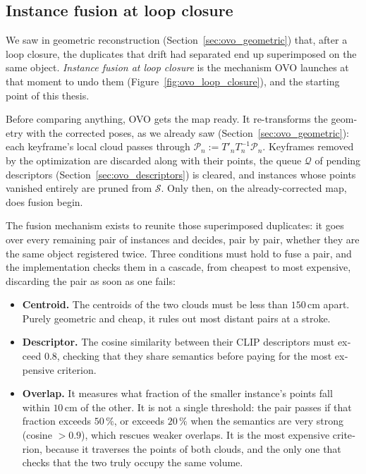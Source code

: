 \begin{otherlanguage}{english}
\subsection{Instance fusion at loop closure}
\label{sec:ovo_fusion_lc}

We saw in geometric reconstruction (Section~\ref{sec:ovo_geometric}) that, after a loop closure, the
duplicates that drift had separated end up superimposed on the same object. \emph{Instance fusion at
loop closure} is the mechanism OVO launches at that moment to undo them
(Figure~\ref{fig:ovo_loop_closure}), and the starting point of this thesis.

Before comparing anything, OVO gets the map ready. It re-transforms the geometry with the corrected
poses, as we already saw (Section~\ref{sec:ovo_geometric}): each keyframe's local cloud passes
through $\mathcal{P}_n := T'_n T_n^{-1} \mathcal{P}_n$. Keyframes removed by the optimization are
discarded along with their points, the queue $\mathcal{Q}$ of pending descriptors
(Section~\ref{sec:ovo_descriptors}) is cleared, and instances whose points vanished entirely are
pruned from $\mathcal{S}$. Only then, on the already-corrected map, does fusion begin.

The fusion mechanism exists to reunite those superimposed duplicates: it goes over every remaining
pair of instances and decides, pair by pair, whether they are the same object registered twice. Three
conditions must hold to fuse a pair, and the implementation checks them in a cascade, from cheapest
to most expensive, discarding the pair as soon as one fails:

\begin{itemize}
  \item \textbf{Centroid.} The centroids of the two clouds must be less than $150\,\text{cm}$ apart.
    Purely geometric and cheap, it rules out most distant pairs at a stroke.
  \item \textbf{Descriptor.} The cosine similarity between their CLIP descriptors must exceed $0.8$,
    checking that they share semantics before paying for the most expensive criterion.
  \item \textbf{Overlap.} It measures what fraction of the smaller instance's points fall within
    $10\,\text{cm}$ of the other. It is not a single threshold: the pair passes if that fraction
    exceeds $50\,\%$, or exceeds $20\,\%$ when the semantics are very strong (cosine $> 0.9$), which
    rescues weaker overlaps. It is the most expensive criterion, because it traverses the points of
    both clouds, and the only one that checks that the two truly occupy the same volume.
\end{itemize}


\end{otherlanguage}
